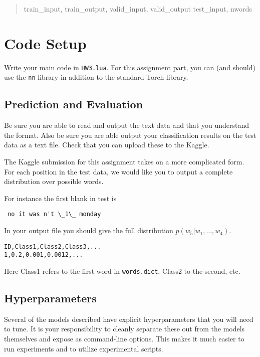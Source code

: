 \documentclass[11pt]{article}
\begin{document}
\begin{quote}
  train\_input, train\_output,
  valid\_input,
  valid\_output
  test\_input, nwords
\end{quote}

\section{Code Setup}

Write your main code in \texttt{HW3.lua}. For this assignment part,
you can (and should) use the \texttt{nn} library in addition to the
standard Torch library. 

\subsection{Prediction and Evaluation}

Be sure you are able to read and output the text data and that you
understand the format.  Also be sure you are able output your
classification results on the test data as a text file. Check that you
can upload these to the Kaggle. 

The Kaggle submission for this assignment takes on a more complicated form. 
For each position in the test data, we would like you to output a complete 
distribution over possible words.

For instance the first blank in test is 

\begin{verbatim}
 no it was n't \_1\_ monday 
\end{verbatim}

In your output file you should give the full distribution $p(w_5 | w_1, \ldots, w_4)$.

\begin{verbatim}
ID,Class1,Class2,Class3,...
1,0.2,0.001,0.0012,...
\end{verbatim}

Here Class1 refers to the first word in \texttt{words.dict}, Class2 to the second, etc.

\subsection{Hyperparameters}

Several of the models described have explicit hyperparameters that you will 
need to tune. It is your responsibility to cleanly separate these out from 
the models themselves and expose as command-line options. This makes it much 
easier to run experiments and to utilize experimental scripts. 
\end{document}
